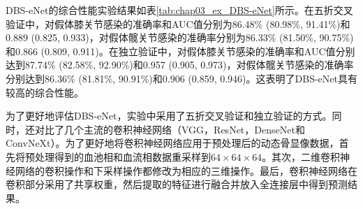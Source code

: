 DBS-eNet的综合性能实验结果如表\ref{tab:chap03_ex_DBS-eNet}所示。在五折交叉验证中，对假体膝关节感染的准确率和AUC值分别为86.48\% (80.98\%, 91.41\%)和0.889 (0.825, 0.933)，对假体髋关节感染的准确率分别为86.33\% (81.50\%, 90.75\%)和0.866 (0.809, 0.911)。在独立验证中，对假体膝关节感染的准确率和AUC值分别达到87.74\% (82.58\%, 92.90\%)和0.957 (0.905, 0.973)，对假体髋关节感染的准确率分别达到86.36\% (81.81\%, 90.91\%)和0.906 (0.859, 0.946)。这表明了DBS-eNet具有较高的综合性能。

为了更好地评估DBS-eNet，实验中采用了五折交叉验证和独立验证的方式。同时，还对比了几个主流的卷积神经网络（VGG\cite{Simonyan2014VeryDC}，ResNet\cite{he2016deep}，DenseNet\cite{huang2017densely}和ConvNeXt\cite{liu2022convnet}）。为了更好地将卷积神经网络应用于预处理后的动态骨显像数据，首先将预处理得到的血池相和血流相数据重采样到\(64 \times 64 \times 64\)。其次，二维卷积神经网络的卷积操作和下采样操作都修改为相应的三维操作。最后，卷积神经网络在卷积部分采用了共享权重，然后提取的特征进行融合并放入全连接层中得到预测结果。

